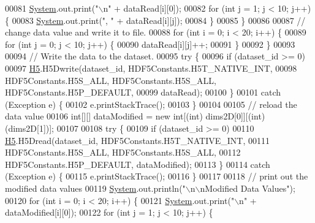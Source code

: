 \begin{DoxyCode}
00081             \hyperlink{namespace_system}{System}.out.print(\textcolor{stringliteral}{"\(\backslash\)n"} + dataRead[i][0]);
00082             \textcolor{keywordflow}{for} (\textcolor{keywordtype}{int} j = 1; j < 10; j++) \{
00083                 \hyperlink{namespace_system}{System}.out.print(\textcolor{stringliteral}{", "} + dataRead[i][j]);
00084             \}
00085         \}
00086 
00087         \textcolor{comment}{// change data value and write it to file.}
00088         \textcolor{keywordflow}{for} (\textcolor{keywordtype}{int} i = 0; i < 20; i++) \{
00089             \textcolor{keywordflow}{for} (\textcolor{keywordtype}{int} j = 0; j < 10; j++) \{
00090                 dataRead[i][j]++;
00091             \}
00092         \}
00093 
00094         \textcolor{comment}{// Write the data to the dataset.}
00095         \textcolor{keywordflow}{try} \{
00096             \textcolor{keywordflow}{if} (dataset\_id >= 0)
00097                 \hyperlink{namespace_h5}{H5}.H5Dwrite(dataset\_id, HDF5Constants.H5T\_NATIVE\_INT,
00098                         HDF5Constants.H5S\_ALL, HDF5Constants.H5S\_ALL, HDF5Constants.H5P\_DEFAULT,
00099                         dataRead);
00100         \}
00101         \textcolor{keywordflow}{catch} (Exception e) \{
00102             e.printStackTrace();
00103         \}
00104 
00105         \textcolor{comment}{// reload the data value}
00106         \textcolor{keywordtype}{int}[][] dataModified = \textcolor{keyword}{new} \textcolor{keywordtype}{int}[(int) dims2D[0]][(\textcolor{keywordtype}{int}) (dims2D[1])];
00107 
00108         \textcolor{keywordflow}{try} \{
00109             \textcolor{keywordflow}{if} (dataset\_id >= 0)
00110                 \hyperlink{namespace_h5}{H5}.H5Dread(dataset\_id, HDF5Constants.H5T\_NATIVE\_INT,
00111                         HDF5Constants.H5S\_ALL, HDF5Constants.H5S\_ALL,
00112                         HDF5Constants.H5P\_DEFAULT, dataModified);
00113         \}
00114         \textcolor{keywordflow}{catch} (Exception e) \{
00115             e.printStackTrace();
00116         \}
00117 
00118         \textcolor{comment}{// print out the modified data values}
00119         \hyperlink{namespace_system}{System}.out.println(\textcolor{stringliteral}{"\(\backslash\)n\(\backslash\)nModified Data Values"});
00120         \textcolor{keywordflow}{for} (\textcolor{keywordtype}{int} i = 0; i < 20; i++) \{
00121             \hyperlink{namespace_system}{System}.out.print(\textcolor{stringliteral}{"\(\backslash\)n"} + dataModified[i][0]);
00122             \textcolor{keywordflow}{for} (\textcolor{keywordtype}{int} j = 1; j < 10; j++) \{

\end{DoxyCode}
